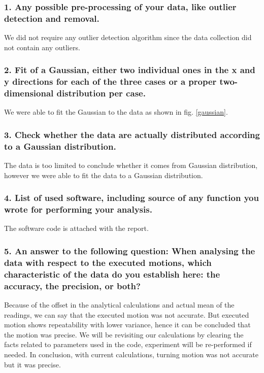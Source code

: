 \subsubsection*{1. Any possible pre-processing of your data, like outlier detection and removal.}
We did not require any outlier detection algorithm since the data collection did not contain any outliers.

\subsubsection*{2. Fit of a Gaussian, either two individual ones in the x and y directions for each of the three cases or a proper two-dimensional distribution per case.}
We were able to fit the Gaussian to the data as shown in fig. \ref{gaussian}.

\subsubsection*{3. Check whether the data are actually distributed according to a Gaussian distribution.}
The data is too limited to conclude whether it comes from Gaussian distribution, however we were able to fit the data to a Gaussian distribution.

\subsubsection*{4. List of used software, including source of any function you wrote for performing your analysis.}
The software code is attached with the report.

\subsubsection*{5. An answer to the following question: When analysing the data with respect to the executed motions, which characteristic of the data do you establish here: the accuracy, the precision, or both?}

Because of the offset in the analytical calculations and actual mean of the readings, we can say that the executed motion was not accurate. But executed motion shows repeatability with lower variance, hence it can be concluded that the motion was precise. We will be revisiting our calculations by clearing the facts related to parameters used in the code, experiment will be re-performed if needed. In conclusion, with current calculations, turning motion was not accurate but it was precise. 
